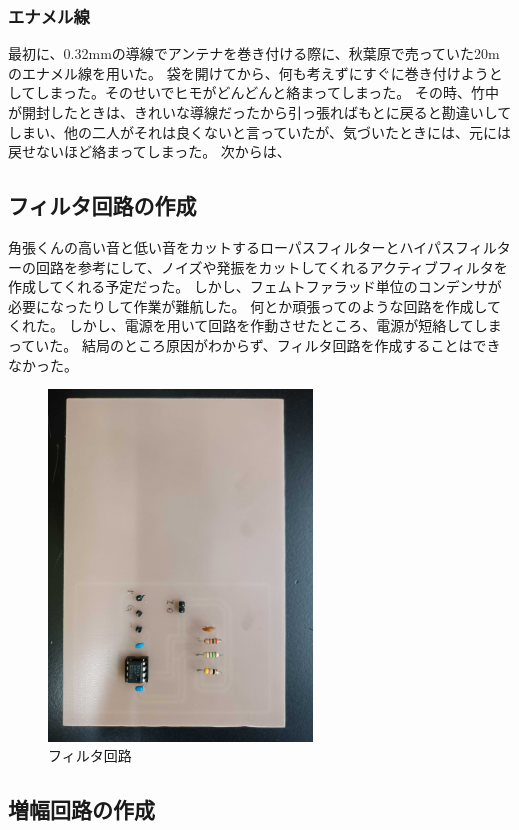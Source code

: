 \documentclass[report.tex]{subfiles}
\begin{document}
\subsubsection{エナメル線}

最初に、0.32mmの導線でアンテナを巻き付ける際に、秋葉原で売っていた20mのエナメル線を用いた。
袋を開けてから、何も考えずにすぐに巻き付けようとしてしまった。そのせいでヒモがどんどんと絡まってしまった。
その時、竹中が開封したときは、きれいな導線だったから引っ張ればもとに戻ると勘違いしてしまい、他の二人がそれは良くないと言っていたが、気づいたときには、元には戻せないほど絡まってしまった。
次からは、

\subsection{フィルタ回路の作成}

角張くんの高い音と低い音をカットするローパスフィルターとハイパスフィルターの回路を参考にして、ノイズや発振をカットしてくれるアクティブフィルタを作成してくれる予定だった。
しかし、フェムトファラッド単位のコンデンサが必要になったりして作業が難航した。
何とか頑張ってのような回路を作成してくれた。
しかし、電源を用いて回路を作動させたところ、電源が短絡してしまっていた。
結局のところ原因がわからず、フィルタ回路を作成することはできなかった。

\begin{figure}[H]
	\centering
	\includegraphics[width=7cm]{use/1.jpg}
	\caption{フィルタ回路}
	\label{fig:filter}
\end{figure}

\subsection{増幅回路の作成}
\end{document}
